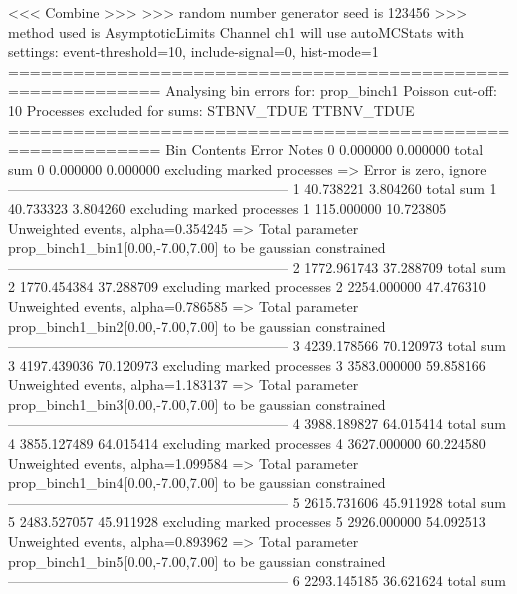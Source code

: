  <<< Combine >>> 
>>> random number generator seed is 123456
>>> method used is AsymptoticLimits
Channel ch1 will use autoMCStats with settings: event-threshold=10, include-signal=0, hist-mode=1
============================================================
Analysing bin errors for: prop_binch1
Poisson cut-off: 10
Processes excluded for sums: STBNV_TDUE TTBNV_TDUE
============================================================
Bin        Contents        Error           Notes                         
0          0.000000        0.000000        total sum                     
0          0.000000        0.000000        excluding marked processes    
  => Error is zero, ignore      
------------------------------------------------------------
1          40.738221       3.804260        total sum                     
1          40.733323       3.804260        excluding marked processes    
1          115.000000      10.723805       Unweighted events, alpha=0.354245
  => Total parameter prop_binch1_bin1[0.00,-7.00,7.00] to be gaussian constrained
------------------------------------------------------------
2          1772.961743     37.288709       total sum                     
2          1770.454384     37.288709       excluding marked processes    
2          2254.000000     47.476310       Unweighted events, alpha=0.786585
  => Total parameter prop_binch1_bin2[0.00,-7.00,7.00] to be gaussian constrained
------------------------------------------------------------
3          4239.178566     70.120973       total sum                     
3          4197.439036     70.120973       excluding marked processes    
3          3583.000000     59.858166       Unweighted events, alpha=1.183137
  => Total parameter prop_binch1_bin3[0.00,-7.00,7.00] to be gaussian constrained
------------------------------------------------------------
4          3988.189827     64.015414       total sum                     
4          3855.127489     64.015414       excluding marked processes    
4          3627.000000     60.224580       Unweighted events, alpha=1.099584
  => Total parameter prop_binch1_bin4[0.00,-7.00,7.00] to be gaussian constrained
------------------------------------------------------------
5          2615.731606     45.911928       total sum                     
5          2483.527057     45.911928       excluding marked processes    
5          2926.000000     54.092513       Unweighted events, alpha=0.893962
  => Total parameter prop_binch1_bin5[0.00,-7.00,7.00] to be gaussian constrained
------------------------------------------------------------
6          2293.145185     36.621624       total sum                     
